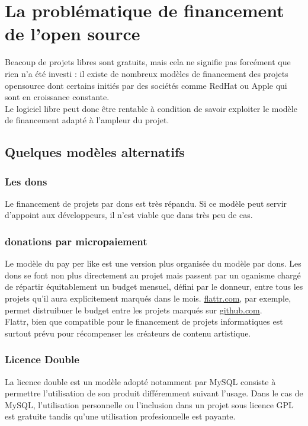 \chapter{La problématique de financement de l'open source}

Beacoup de projets libres sont gratuits, mais cela ne signifie pas forcément que
rien n'a été investi : il existe de nombreux modèles de financement des projets
opensource dont certains initiés par des sociétés comme RedHat ou Apple qui sont
en croissance constante.\\
Le logiciel libre peut donc être rentable à condition de savoir exploiter
le modèle de financement adapté à l'ampleur du projet.

\section{Quelques modèles alternatifs}

    \subsection{Les dons}

Le financement de projets par dons est très répandu.
Si ce modèle peut servir d'appoint aux développeurs, il n'est viable que dans
très peu de cas.
    
    \subsection{donations par micropaiement}

Le modèle du pay per like est une version plus organisée du modèle par dons. Les
dons se font non plus directement au projet mais passent par un oganisme chargé
de répartir équitablement un budget mensuel, défini par le donneur, entre tous
les projets qu'il aura explicitement marqués dans le mois.
\url{flattr.com}, par exemple, permet distruibuer le budget entre les projets
marqués sur \url{github.com}.\\
Flattr, bien que compatible pour le financement de projets informatiques est
surtout prévu pour récompenser les créateurs de contenu artistique.

    \subsection{Licence Double}

La licence double est un modèle adopté notamment par MySQL consiste à permettre
l'utilisation de son produit différemment suivant l'usage. Dans le cas de MySQL,
l'utilisation personnelle ou l'inclusion dans un projet sous licence GPL est
gratuite tandis qu'une utilisation profesionnelle est payante.

